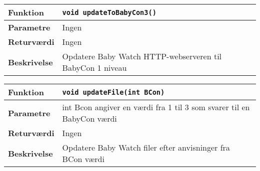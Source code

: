 \begin{center}
    \begin{tabular}{ | l | p{} |}
    \hline
    \textbf{Funktion}	& \verb+void updateToBabyCon3() +						\\ \hline
    \textbf{Parametre} 	& Ingen													\\ \hline
    \textbf{Returværdi}	& Ingen 												\\ \hline
    \textbf{Beskrivelse}	& Opdatere Baby Watch HTTP-webserveren til BabyCon 1 niveau\\ \hline
    \end{tabular}
\end{center}


\begin{center}
    \begin{tabular}{ | l | p{} |}
    \hline
    \textbf{Funktion}	& \verb+void updateFile(int BCon) +						\\ \hline
    \textbf{Parametre} 	& int Bcon angiver en værdi fra 1 til 3 som svarer til en BabyCon værdi													\\ \hline
    \textbf{Returværdi}	& Ingen 												\\ \hline
    \textbf{Beskrivelse}	& Opdatere Baby Watch filer efter anvisninger fra BCon værdi\\ \hline
    \end{tabular}
\end{center}

